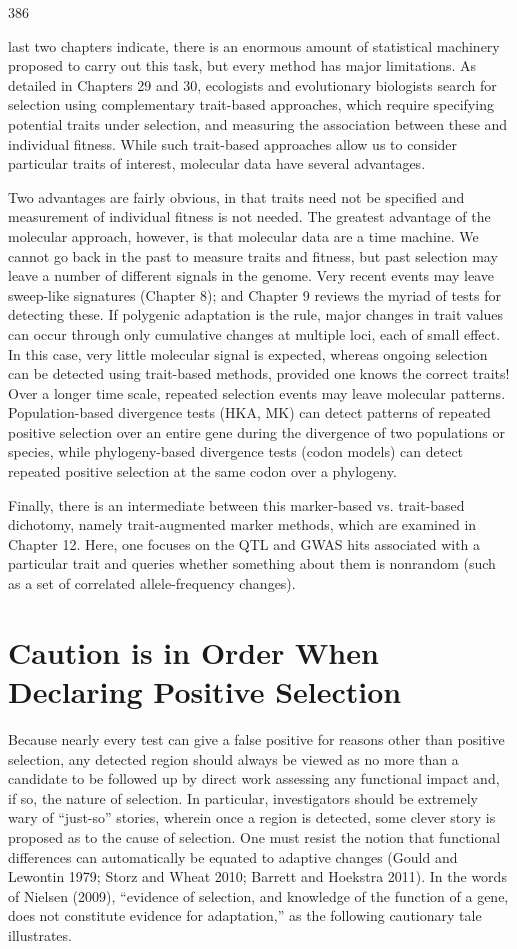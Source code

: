 \documentclass{article}
\begin{document}
386

last two chapters indicate, there is an enormous amount of statistical machinery proposed to carry out this task, but every method has major limitations. As detailed in Chapters 29 and 30, ecologists and evolutionary biologists search for selection using complementary trait-based approaches, which require specifying potential traits under selection, and measuring the association between these and individual fitness. While such trait-based approaches allow us to consider particular traits of interest, molecular data have several advantages.

Two advantages are fairly obvious, in that traits need not be specified and measurement of individual fitness is not needed. The greatest advantage of the molecular approach, however, is that molecular data are a time machine. We cannot go back in the past to measure traits and fitness, but past selection may leave a number of different signals in the genome. Very recent events may leave sweep-like signatures (Chapter 8); and Chapter 9 reviews the myriad of tests for detecting these. If polygenic adaptation is the rule, major changes in trait values can occur through only cumulative changes at multiple loci, each of small effect. In this case, very little molecular signal is expected, whereas ongoing selection can be detected using trait-based methods, provided one knows the correct traits! Over a longer time scale, repeated selection events may leave molecular patterns. Population-based divergence tests (HKA, MK) can detect patterns of repeated positive selection over an entire gene during the divergence of two populations or species, while phylogeny-based divergence tests (codon models) can detect repeated positive selection at the same codon over a phylogeny.

Finally, there is an intermediate between this marker-based vs. trait-based dichotomy, namely trait-augmented marker methods, which are examined in Chapter 12. Here, one focuses on the QTL and GWAS hits associated with a particular trait and queries whether something about them is nonrandom (such as a set of correlated allele-frequency changes).

\section{Caution is in Order When Declaring Positive Selection}
Because nearly every test can give a false positive for reasons other than positive selection, any detected region should always be viewed as no more than a candidate to be followed up by direct work assessing any functional impact and, if so, the nature of selection. In particular, investigators should be extremely wary of “just-so” stories, wherein once a region is detected, some clever story is proposed as to the cause of selection. One must resist the notion that functional differences can automatically be equated to adaptive changes (Gould and Lewontin 1979; Storz and Wheat 2010; Barrett and Hoekstra 2011). In the words of Nielsen (2009), “evidence of selection, and knowledge of the function of a gene, does not constitute evidence for adaptation,” as the following cautionary tale illustrates.
\end{document}
